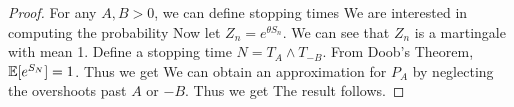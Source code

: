 \documentclass[a4paper,10pt,english]{article}
\begin{document}
\begin{proof}
For any $A,B > 0$, we can define stopping times
We are interested in computing the probability 
Now let $Z_n = e^{\theta S_n}$. We can see that $Z_n$ is a martingale with mean 1. 
Define a stopping time $N = T_A \wedge T_{-B}$. 
From Doob's Theorem, $\mathbb{E}[e^{S_N}] = 1$. 
Thus we get
We can obtain an approximation for $P_A$ by neglecting the overshoots past $A$ or $-B$. 
Thus we get
The result follows. 
\end{proof}

\end{document}
